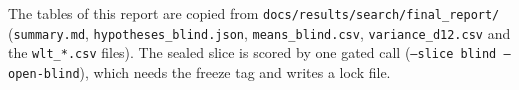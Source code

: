 \documentclass[11pt]{article}
\begin{document}
\noindent The tables of this report are copied from \texttt{docs/results/search/final\_report/} (\texttt{summary.md}, \texttt{hypotheses\_blind.json}, \texttt{means\_blind.csv}, \texttt{variance\_d12.csv} and the \texttt{wlt\_*.csv} files). The sealed slice is scored by one gated call (\texttt{--slice blind --open-blind}), which needs the freeze tag and writes a lock file.
\end{document}
